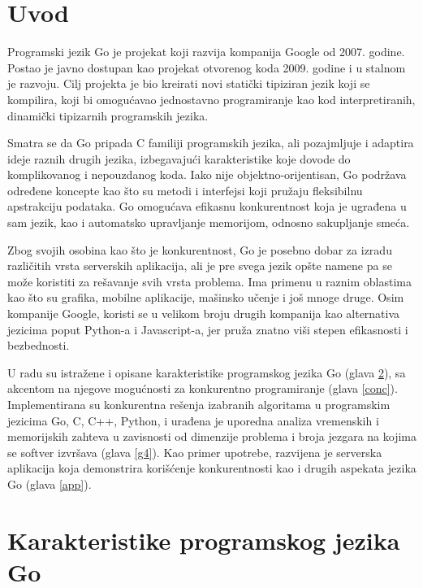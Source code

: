 \documentclass[12pt,oneside]{memoir}
\begin{document}
\frontmatter
\naslovna
\komisija
{}
\apstrakt
\tableofcontents*
\mainmatter

\chapter{Uvod}

Programski jezik Go je projekat koji razvija kompanija Google od 2007. godine. Postao je javno dostupan kao projekat otvorenog koda 2009. godine i u stalnom je razvoju. Cilj projekta je bio kreirati novi statički tipiziran jezik koji se kompilira, koji bi omogućavao jednostavno programiranje kao kod interpretiranih, dinamički tipizarnih programskih jezika. 

Smatra se da Go pripada C familiji programskih jezika, ali pozajmljuje i adaptira ideje raznih drugih jezika, izbegavajući karakteristike koje dovode do komplikovanog i nepouzdanog koda. Iako nije objektno-orijentisan, Go podržava određene koncepte kao što su metodi i interfejsi koji pružaju fleksibilnu apstrakciju podataka. Go omogućava efikasnu konkurentnost koja je ugrađena u sam jezik, kao i automatsko upravljanje memorijom, odnosno sakupljanje smeća. 

Zbog svojih osobina kao što je konkurentnost, Go je posebno dobar za izradu različitih vrsta serverskih aplikacija, ali je pre svega jezik opšte namene pa se može koristiti za rešavanje svih vrsta problema. Ima primenu u raznim oblastima kao što su grafika, mobilne aplikacije, mašinsko učenje i još mnoge druge. Osim kompanije Google, koristi se u velikom broju drugih kompanija kao alternativa jezicima poput Python-a i Javascript-a, jer pruža znatno viši stepen efikasnosti i bezbednosti.

U radu su istražene i opisane karakteristike programskog jezika Go (glava \ref{g2}), sa akcentom na njegove mogućnosti za konkurentno programiranje (glava \ref{conc}). Implementirana su konkurentna rešenja izabranih algoritama u programskim jezicima Go, C, C++, Python, i urađena je uporedna analiza vremenskih i memorijskih zahteva u  zavisnosti od dimenzije problema i broja jezgara na kojima se softver izvršava (glava \ref{g4}). Kao primer upotrebe, razvijena je serverska aplikacija koja demonstrira korišćenje konkurentnosti kao i drugih aspekata jezika Go (glava \ref{app}).


\chapter{Karakteristike programskog jezika Go} \label{g2}
\end{document}
